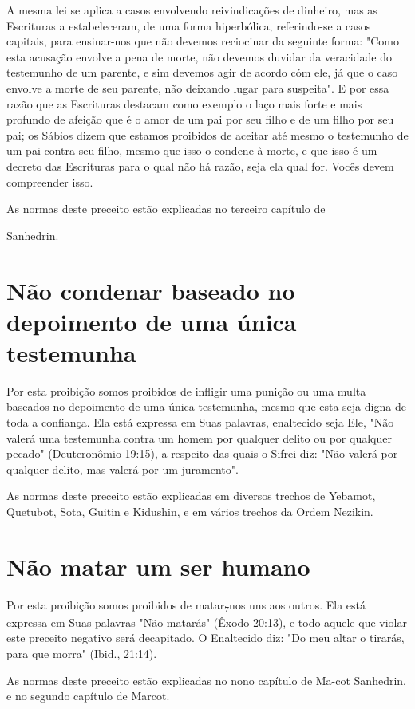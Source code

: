 \begin{itemize}
\begin{enumrate}
\begin{itemize}
\begin{itemize}
\begin{itemize}
A mesma lei se aplica a casos envolvendo reivindicações de dinhei­ro,
mas as Escrituras a estabeleceram, de uma forma hiperbólica,
referindo-se a casos capitais, para ensinar-nos que não devemos
reciocinar da seguinte for­ma: "Como esta acusação envolve a pena de
morte, não devemos duvidar da veracidade do testemunho de um parente, e
sim devemos agir de acordo cóm ele, já que o caso envolve a morte de seu
parente, não deixando lugar para sus­peita". E por essa razão que as
Escrituras destacam como exemplo o laço mais forte e mais profundo de
afeição que é o amor de um pai por seu filho e de um filho por seu pai;
os Sábios dizem que estamos proibidos de aceitar até mes­mo o testemunho
de um pai contra seu filho, mesmo que isso o condene à morte, e que isso
é um decreto das Escrituras para o qual não há razão, seja ela qual for.
Vocês devem compreender isso.


As normas deste preceito estão explicadas no terceiro capítulo de


Sanhedrin.

\section{Não condenar baseado no depoimento de uma única testemunha}

Por esta proibição somos proibidos de infligir uma punição ou uma multa
baseados no depoimento de uma única testemunha, mesmo que esta seja
digna de toda a confiança. Ela está expressa em Suas palavras,
enaltecido seja Ele, "Não valerá uma testemunha contra um homem por
qualquer delito ou por qualquer pecado" (Deuteronômio 19:15), a respeito
das quais o Sifrei diz: "Não valerá por qualquer delito, mas valerá por
um juramento".

As normas deste preceito estão explicadas em diversos trechos de
Yebamot, Quetubot, Sota, Guitin e Kidushin, e em vários trechos da Ordem
Nezikin.

\section{Não matar um ser humano}

Por esta proibição somos proibidos de matar\textsubscript{7}nos uns aos
outros. Ela está expressa em Suas palavras "Não matarás" (Êxodo 20:13),
e todo aquele que violar este preceito negativo será decapitado. O
Enaltecido diz: "Do meu altar o tirarás, para que morra" (Ibid., 21:14).

As normas deste preceito estão explicadas no nono capítulo de Ma-cot
Sanhedrin, e no segundo capítulo de Marcot.



\end{itemize}
\end{itemize}
\end{itemize}
\end{enumrate}
\end{itemize}
